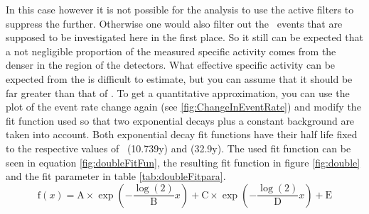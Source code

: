 In this case however it is not possible for the analysis to use the active filters to suppress the  further.
Otherwise one would also filter out the \Kr\ events that are supposed to be investigated here in the first place.
So it still can be expected that a not negligible proportion of the measured specific activity comes from the denser  in the region of the detectors.
What effective specific activity can be expected from the  is difficult to estimate, but you can assume that it should be far greater than that of \Kr.
To get a quantitative approximation, you can use the plot of the event rate change again (see \ref{fig:ChangeInEventRate}) and modify the fit function used so that two exponential decays plus a constant background are taken into account.
Both exponential decay fit functions have their half life fixed to the respective values of \Kr\ (10.739y) and  (32.9y).
The used fit function can be seen in equation \ref{fig:doubleFitFun}, the resulting fit function in figure \ref{fig:double} and the fit parameter in table \ref{tab:doubleFitpara}.
\begin{equation}
\mathrm{f}(x) = \mathrm{A}\times\exp\left(-\frac{\log(2)}{\mathrm{B}} x \right) + \mathrm{C}\times\exp\left(-\frac{\log(2)}{\mathrm{D}} x \right) + \mathrm{E}
\label{equ:doubleFitFun}
\end{equation}


